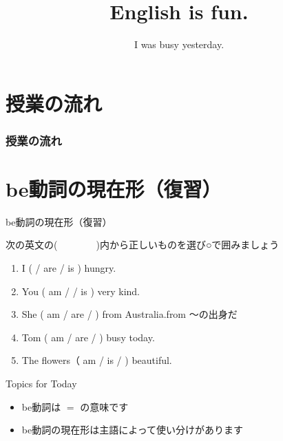 \documentclass[aspectratio=169,xcolor={dvipsnames,table}]{beamer}
\title{English is fun.}
\subtitle{I was busy yesterday.}
\author{}
\institute[]{}
\date[]
\newcommand{\myaudio}[1]{\href{#1}{\faVolumeUp}}
\begin{document}
\begin{frame}[plain]
  \titlepage
\end{frame}

\section*{授業の流れ}
\begin{frame}[plain]
  \frametitle{授業の流れ}
  \tableofcontents
\end{frame}


\section{be動詞の現在形（復習）}

\begin{frame}[plain]{be動詞の現在形（復習）}

次の英文の(~~~~~~~~)内から正しいものを選び○で囲みましょう

\begin{enumerate}
 \item I (  / are  / is ) hungry.
 \item You ( am /  / is ) very kind.
 \item She ( am / are /  ) from Australia.\hfill{\scriptsize from ～の出身だ}
 \item Tom ( am / are /  ) busy today.
 \item The flowers（ am / is /  ) beautiful.
\end{enumerate}

\hfill{\scriptsize \myaudio{./audio/024_past_be_01.mp3}}

\begin{block}{Topics for Today}
\pause
\begin{itemize}[square]\small
 \item be動詞は $=$ の意味です
 \item be動詞の現在形は主語によって使い分けがあります
\end{itemize}
     \end{block}

\end{frame}
\end{document}
